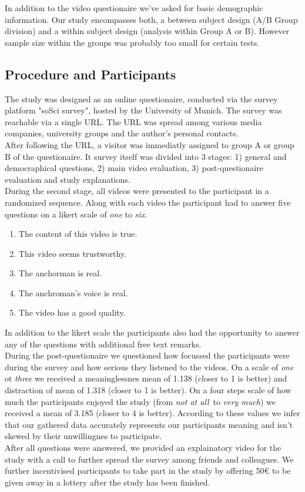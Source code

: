 \documentclass[
  a4paper,  %
  twoside,  %
  bibliography=totoc,
  headsepline,
  cleardoublepage=empty,
  parskip=half,
  draft=false
]{scrbook}
\begin{document}
In addition to the video questionaire we've asked for basic demographic information. 
Our study encompasses both, a between subject design (A/B Group division) and a within subject design (analysis within Group A or B). However sample size within the groups was probably too small for certain tests.

\subsection{Procedure and Participants}
The study was designed as an online questionaire, conducted via the survey platform "soSci survey", hosted by the University of Munich. The survey was reachable via a single URL. The URL was spread among various media companies, university groups and the author's personal contacts. \\
After following the URL, a visitor was immediatly assigned to group A or group B of the questionaire. It survey itself was divided into 3 stages: 1) general and democraphical questions, 2) main video evaluation, 3) post-questionaire evaluation and study explanations. \\ 
During the second stage, all videos were presented to the participant in a randomized sequence. Along with each video the participant had to answer five questions on a likert scale of \textit{one} to \textit{six}.
\begin{enumerate}
  \item The content of this video is true.
  \item This video seems trustworthy.
  \item The anchorman is real.
  \item The anchroman's voice is real.
  \item The video has a good quality.
\end{enumerate}
In addition to the likert scale the participants also had the opportunity to answer any of the questions with additional free text remarks. \\
During the post-questionaire we questioned how focussed the participants were during the survey and how serious they listened to the videos. On a scale of \textit{one} ot \textit{three} we received a meaninglessnes mean of 1.138 (closer to 1 is better) and distraction of mean of 1.318 (closer to 1 is better). On a four steps scale of how much the participants enjoyed the study (from \textit{not at all} to \textit{very much}) we received a mean of 3.185 (closer to 4 is better). According to these values we infer that our gathered data accurately represents our participants meaning and isn't skewed by their unwillingnes to participate. \\
After all questions were answered, we provided an explainatory video for the study with a call to further spread the survey among friends and colleagues. We further incentivised participants to take part in the study by offering 50€ to be given away in a lottery after the study has been finished.
\end{document}
